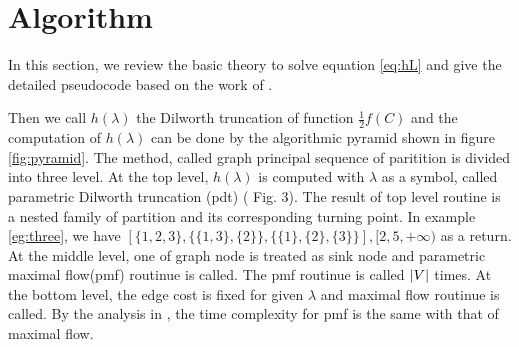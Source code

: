 \documentclass{article}
\begin{document}
\section{Algorithm}\label{sec:algorithm}

In this section, we review the basic theory to solve equation \eqref{eq:hL} and give the detailed pseudocode based on the work of \cite{RN4}.

Then we call $h(\lambda)$ the Dilworth truncation of function $ \frac{1}{2} f(C)$ and the computation of $h(\lambda)$ can be done by the algorithmic pyramid shown in figure \ref{fig:pyramid}. The method, called graph principal sequence of paritition is divided into three level. At the top level, $h(\lambda)$ is computed with $\lambda$ as a symbol, called parametric Dilworth truncation (pdt) (\cite{RN4} Fig. 3). The result of top level routine is a nested family of partition and its corresponding turning point. In example \ref{eg:three}, we have $[\{1,2,3\},\{\{1,3\},\{2\}\},\{\{1\},\{2\},\{3\}\}],[2,5,+\infty) $ as a return. At the middle level, one of graph node is treated as sink node and parametric maximal flow(pmf) routinue is called.
The pmf routinue is called $\lvert V\rvert$ times. At the bottom level, the edge cost is fixed for given $\lambda$ and maximal flow routinue is called. By the analysis in \cite{RN17}, the time complexity for pmf is the same with that of maximal flow.
\end{document}
